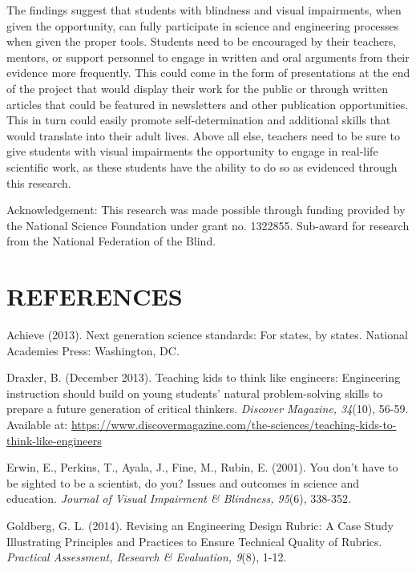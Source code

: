 \documentclass[11.5pt]{sig-alternate} %
\begin{document}
\begin{large}
The findings suggest that students with blindness and visual impairments, when given the opportunity, can fully participate in science and engineering processes when given the proper tools. Students need to be encouraged by their teachers, mentors, or support personnel to engage in written and oral arguments from their evidence more frequently. This could come in the form of presentations at the end of the project that would display their work for the public or through written articles that could be featured in newsletters and other publication opportunities. This in turn could easily promote self-determination and additional skills that would translate into their adult lives. Above all else, teachers need to be sure to give students with visual impairments the opportunity to engage in real-life scientific work, as these students have the ability to do so as evidenced through this research.

Acknowledgement: This research was made possible through funding provided by the National Science Foundation under grant no. 1322855. Sub-award for research from the National Federation of the Blind.  

\end{large}
 
\section*{REFERENCES}\par 

\leftskip 0.25in
\parindent -0.25in 
Achieve (2013).  Next generation science standards: For states, by states.  National Academies Press: 
Washington, DC.

Draxler, B. (December 2013).  Teaching kids to think like engineers: Engineering instruction should build on young students’ natural problem-solving skills to prepare a future generation of critical thinkers. \textit{Discover Magazine, 34}(10), 56-59.  Available at: \url{https://www.discovermagazine.com/the-sciences/teaching-kids-to-think-like-engineers}

Erwin, E., Perkins, T., Ayala, J., Fine, M., Rubin, E. (2001).  You don’t have to be sighted to be a scientist, do you? Issues and outcomes in science and education. \textit{Journal of Visual Impairment \& Blindness, 95}(6), 338-352.

Goldberg, G. L. (2014). Revising an Engineering Design Rubric: A Case Study Illustrating Principles and Practices to Ensure Technical Quality of Rubrics. \textit{Practical Assessment, Research \& Evaluation, 9}(8), 1-12.
\end{document}
